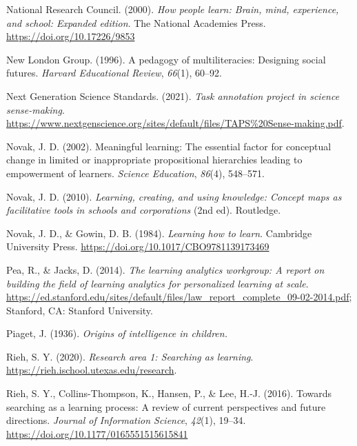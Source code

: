 \documentclass[letterpaper, nobind]{templates/ociamthesis}
\newlength{\cslhangindent}
\newenvironment{CSLReferences}[2] %
 {%
  \setlength{\parindent}{0pt}
  \ifodd #1
  \let\oldpar\par
  \def\par{\hangindent=\cslhangindent\oldpar}
  \fi
  \setlength{\parskip}{1mm}
  \setlength{\baselineskip}{6mm}
 }%
 {}
\begin{document}
\begin{CSLReferences}{1}{0}
\leavevmode{}%
National Research Council. (2000). \emph{How people learn: {Brain}, mind, experience, and school: {Expanded} edition}. {The National Academies Press}. \url{https://doi.org/10.17226/9853}

\leavevmode{}%
New London Group. (1996). A pedagogy of multiliteracies: Designing social futures. \emph{Harvard Educational Review}, \emph{66}(1), 60--92.

\leavevmode{}%
Next Generation Science Standards. (2021). \emph{Task annotation project in science \textbar{} sense-making}. \url{https://www.nextgenscience.org/sites/default/files/TAPS\%20Sense-making.pdf}.

\leavevmode{}%
Novak, J. D. (2002). Meaningful learning: The essential factor for conceptual change in limited or inappropriate propositional hierarchies leading to empowerment of learners. \emph{Science Education}, \emph{86}(4), 548--571.

\leavevmode{}%
Novak, J. D. (2010). \emph{Learning, creating, and using knowledge: Concept maps as facilitative tools in schools and corporations} (2nd ed). {Routledge}.

\leavevmode{}%
Novak, J. D., \& Gowin, D. B. (1984). \emph{Learning how to learn}. Cambridge University Press. \url{https://doi.org/10.1017/CBO9781139173469}

\leavevmode{}%
Pea, R., \& Jacks, D. (2014). \emph{The learning analytics workgroup: A report on building the field of learning analytics for personalized learning at scale}. \url{https://ed.stanford.edu/sites/default/files/law_report_complete_09-02-2014.pdf}; Stanford, CA: Stanford University.

\leavevmode{}%
Piaget, J. (1936). \emph{Origins of intelligence in children.}

\leavevmode{}%
Rieh, S. Y. (2020). \emph{Research area 1: Searching as learning}. \url{https://rieh.ischool.utexas.edu/research}.

\leavevmode{}%
Rieh, S. Y., Collins-Thompson, K., Hansen, P., \& Lee, H.-J. (2016). Towards searching as a learning process: A review of current perspectives and future directions. \emph{Journal of Information Science}, \emph{42}(1), 19--34. \url{https://doi.org/10.1177/0165551515615841}


\end{CSLReferences}
\end{document}
